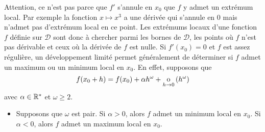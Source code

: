 \documentclass{magnoliaold}
\begin{document}
\begin{remarques}
\remarque Attention, ce n'est pas parce que $f'$ s'annule en $x_0$ que $f$
  y admet un extrémum local. Par exemple la fonction $x\mapsto x^3$
  a une dérivée qui s'annule en 0 mais n'admet pas d'extrémum local en ce point.
\remarque Les extrémums locaux d'une fonction $f$ définie sur $\mathcal{D}$ sont
  donc à chercher parmi les bornes de $\mathcal{D}$, les points où $f$ n'est
  pas dérivable et ceux où la dérivée de $f$ est nulle.
\remarque Si $f'(x_0)=0$ et $f$ est assez régulière, un développement limité permet généralement de déterminer
  si $f$ admet un maximum ou un minimum local en $x_0$. En effet, supposons que
  \[f(x_0+h)=f(x_0)+\alpha h^\omega+\petitozero{h}{h^\omega}\]
  avec $\alpha\in\Rs$ et $\omega\geq 2$.
  \begin{itemize}
  \item Supposons que $\omega$ est pair. Si $\alpha>0$, alors $f$ admet un minimum local en $x_0$. Si $\alpha<0$, alors $f$ admet un maximum local en $x_0$.
\medskip
{}
\begin{center}
\begin{figure}[H]
\begin{center}
$\qquad$
\begin{tikzpicture}[>=latex,scale=1.0]

\end{tikzpicture}
\end{center}
\end{figure}
\end{center}
\end{itemize}
\end{remarques}
\end{document}
